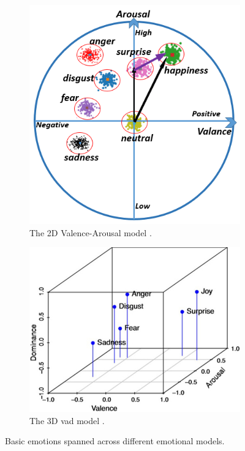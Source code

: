 \begin{figure}
	\centering
	\begin{subfigure}{.5\textwidth}
		\centering
		\includegraphics[width=.75\linewidth]{figs/2_state_of_the_art/emoValAro.png}
		\caption{The 2D Valence-Arousal model \cite{10.1007/11573548_51}.}
		\label{fig:emoValAro}
	\end{subfigure}%
	\begin{subfigure}{.5\textwidth}
		\centering
		\includegraphics[width=\linewidth]{figs/2_state_of_the_art/VAD_Emotions.jpg}
		\caption{The 3D \acl{vad} model \cite{VAD_Emotions_article}.}
		\label{fig:emoVAD}
	\end{subfigure}
	\caption{Basic emotions spanned across different emotional models.}
\end{figure}


